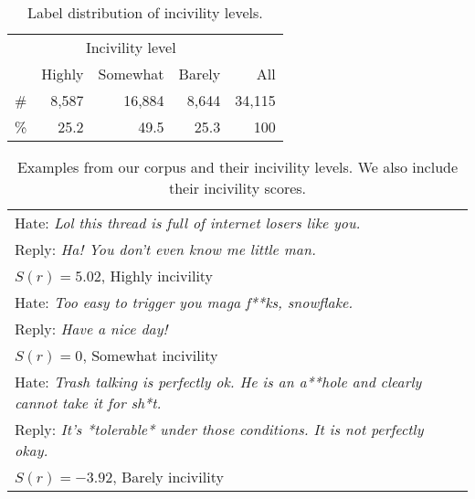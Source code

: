 \documentclass[11pt]{article}
\begin{document}
	\begin{table}
		\centering
		\begin{tabular}{lrrrr}
			\toprule
			& \multicolumn{3}{c}{Incivility level} \\ \cmidrule{2-4} 
			\multicolumn{1}{c}{} & Highly & Somewhat & Barely & All \\
			\hline
			\addlinespace[1pt]
			\# & 8,587 & 16,884 & 8,644 & 34,115 \\ 
			\% & 25.2 & 49.5 & 25.3 & 100 \\
			\bottomrule
		\end{tabular}
		\caption{Label distribution of incivility levels.}
		\label{t:label-distribution}
	\end{table}
	
	\begin{table}[t]
		\small
		\centering
		\begin{tabular}{p{7.2cm}}
			\toprule
			Hate: \emph{Lol this thread is full of internet losers like you.} \\
			Reply: \emph{Ha! You don't even know me little man.}\\ \addlinespace
			$S(r) = 5.02$, Highly incivility\\ 	
			\midrule
			Hate: \emph{Too easy to trigger you maga f**ks, snowflake.} \\
			Reply: \emph{Have a nice day!}\\ \addlinespace
			$S(r) = 0$, Somewhat incivility\\ 					
			\midrule
			Hate: \emph{Trash talking is perfectly ok. He is an a**hole and clearly cannot take it for sh*t.} \\
			Reply: \emph{It's *tolerable* under those conditions. It is not perfectly okay.}\\ \addlinespace
			$S(r) = -3.92$, Barely incivility\\ 
			\bottomrule
		\end{tabular}
		
		\caption{Examples from our corpus and their incivility levels.
			We also include their incivility scores.}
		\label{t:corpus-examples}
	\end{table}
\end{document}

